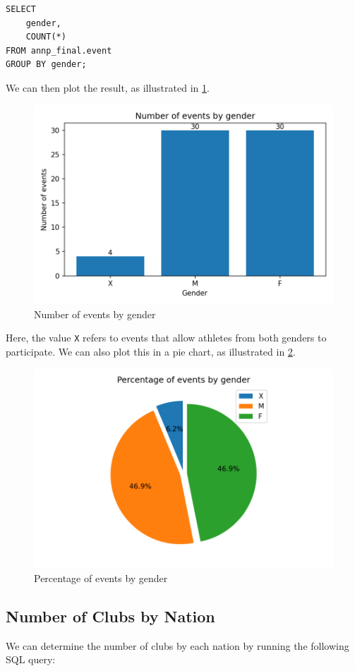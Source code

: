 \documentclass[a4paper, 11pt]{article}
\begin{document}
\begin{verbatim}
SELECT
    gender,
    COUNT(*)
FROM annp_final.event
GROUP BY gender;
\end{verbatim}

We can then plot the result, as illustrated in \cref{fig:eventsbygender}.

\begin{figure}[H]
    \centering
    \includegraphics[width=.6\textwidth]{img/eventsbygender}
    \caption{Number of events by gender}
    \label{fig:eventsbygender}
\end{figure}

Here, the value \texttt{X} refers to events that allow athletes from both genders to participate.
We can also plot this in a pie chart, as illustrated in \cref{fig:eventsbygender-pie}.

\begin{figure}[H]
    \centering
    \includegraphics[width=.65\textwidth]{img/eventsbygender-pie}
    \caption{Percentage of events by gender}
    \label{fig:eventsbygender-pie}
\end{figure}

\subsection{Number of Clubs by Nation}

We can determine the number of clubs by each nation by running the following SQL query:
\end{document}
